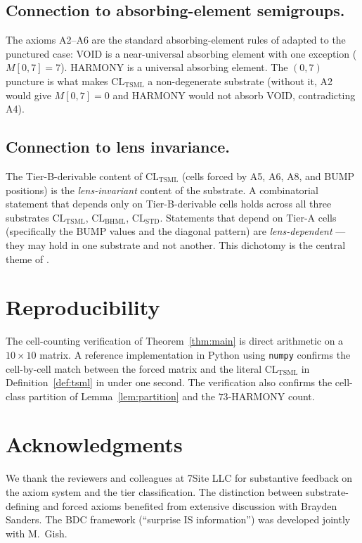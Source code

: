 \documentclass[11pt,reqno]{amsart}
\theoremstyle{plain}
\theoremstyle{definition}
\theoremstyle{remark}
\newcommand{\TSML}{\mathrm{TSML}}
\newcommand{\BHML}{\mathrm{BHML}}
\begin{document}
\subsection{Connection to absorbing-element semigroups.}
The axioms A2--A6 are the standard absorbing-element rules of
\cite{Clifford1961, HowieSemigroup} adapted to the punctured case:
VOID is a near-universal absorbing element with one exception
($M[0, 7] = 7$). HARMONY is a universal absorbing element. The
$(0, 7)$ puncture is what makes $\mathrm{CL}_\TSML$ a non-degenerate
substrate (without it, A2 would give $M[0, 7] = 0$ and HARMONY would
not absorb VOID, contradicting A4).

\subsection{Connection to lens invariance.}
The Tier-B-derivable content of $\mathrm{CL}_\TSML$ (cells forced by
A5, A6, A8, and BUMP positions) is the \emph{lens-invariant} content
of the substrate. A combinatorial statement that depends only on
Tier-B-derivable cells holds across all three substrates
$\mathrm{CL}_\TSML$, $\mathrm{CL}_\BHML$, $\mathrm{CL}_\mathrm{STD}$.
Statements that depend on Tier-A cells (specifically the BUMP values
and the diagonal pattern) are \emph{lens-dependent} --- they may hold
in one substrate and not another. This dichotomy is the central
theme of \cite{SandersLensInvariance}.

\section{Reproducibility}
\label{sec:repro}

The cell-counting verification of Theorem~\ref{thm:main} is direct
arithmetic on a $10 \times 10$ matrix. A reference implementation in
Python using \texttt{numpy} confirms the cell-by-cell match between
the forced matrix and the literal $\mathrm{CL}_\TSML$ in
Definition~\ref{def:tsml} in under one second. The verification also
confirms the cell-class partition of Lemma~\ref{lem:partition} and the
$73$-HARMONY count.

\section*{Acknowledgments}
We thank the reviewers and colleagues at 7Site LLC for substantive
feedback on the axiom system and the tier classification. The
distinction between substrate-defining and forced axioms benefited
from extensive discussion with Brayden Sanders. The BDC framework
(``surprise IS information'') was developed jointly with M.~Gish.
\end{document}
